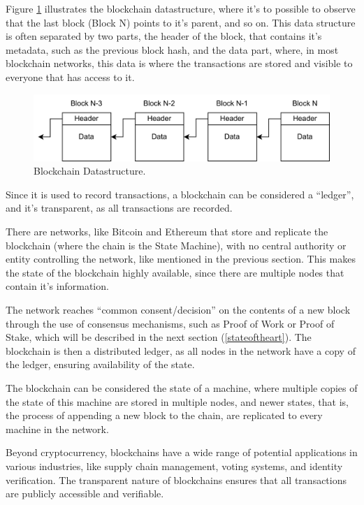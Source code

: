 Figure \ref{fig:blockchain} illustrates the blockchain datastructure, where it's to possible to observe that the last block (Block N) points to it's parent, and so on. This data structure is often separated by two parts, the header of the block, that contains it's metadata, such as the previous block hash, and the data part, where, in most blockchain networks, this data is where the transactions are stored and visible to everyone that has access to it.

\begin{figure}[H]
    \centering
    \includegraphics[width=\textwidth,keepaspectratio]{imagens/blockchain.png}
    \caption{Blockchain Datastructure.}
    \label{fig:blockchain}

\end{figure}

Since it is used to record transactions, a blockchain can be considered a ``ledger'', and it's transparent, as all transactions are recorded.

There are networks, like Bitcoin \cite{nakamoto2008bitcoin} and Ethereum \cite{ethereum_foundation} that store and replicate the blockchain (where the chain is the State Machine), with no central authority or entity controlling the network, like mentioned in the previous section. This makes the state of the blockchain highly available, since there are multiple nodes that contain it's information. 

The network reaches ``common consent/decision'' on the contents of a new block through the use of consensus mechanisms, such as Proof of Work or Proof of Stake, which will be described in the next section (\ref{stateoftheart}).
The blockchain is then a distributed ledger, as all nodes in the network have a copy of the ledger, ensuring availability of the state.

The blockchain can be considered the state of a machine, where multiple copies of the state of this machine are stored in multiple nodes, and newer states, that is, the process of appending a new block to the chain, are replicated to every machine in the network.

Beyond cryptocurrency, blockchains have a wide range of potential applications in various industries, like supply chain management, voting systems, and identity verification. The transparent nature of blockchains ensures that all transactions are publicly accessible and verifiable. 

